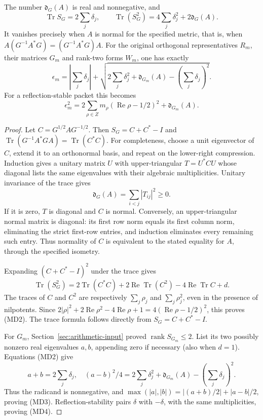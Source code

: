 \begin{theorem}
The number \(\mathfrak d_G(A)\) is real and nonnegative, and
\[
 \operatorname{Tr}S_G=2\sum_j\delta_j,\qquad
 \operatorname{Tr}(S_G^2)=4\sum_j\delta_j^2+2\mathfrak d_G(A).
 \tag{MD2}
\]
It vanishes precisely when \(A\) is normal for the specified
metric, that is, when
\(A(G^{-1}A^*G)=(G^{-1}A^*G)A\).
For the original orthogonal representatives \(R_m\), their
matrices \(G_m\) and rank-two forms \(W_m\), one has exactly
\[
 \epsilon_m=\left|\sum_j\delta_j\right|
 +\sqrt{2\sum_j\delta_j^2+\mathfrak d_{G_m}(A)
                     -\left(\sum_j\delta_j\right)^2}.
 \tag{MD3}
\]
For a reflection-stable packet this becomes
\[
 \boxed{\epsilon_m^2=2\sum_{\rho\in Z}m_\rho
               (\operatorname{Re}\rho-1/2)^2+\mathfrak d_{G_m}(A).}
 \tag{MD4}
\]
\end{theorem}
\begin{proof}
Let \(C=G^{1/2}AG^{-1/2}\). Then
\(S_G=C+C^*-I\) and
\(\operatorname{Tr}(G^{-1}A^*GA)=\operatorname{Tr}(C^*C)\).
For completeness, choose a unit eigenvector of \(C\), extend it
to an orthonormal basis, and repeat on the lower-right compression.
Induction gives a unitary matrix \(U\) with upper-triangular
\(T=U^*CU\) whose diagonal lists the same eigenvalues with their
algebraic multiplicities. Unitary invariance of the trace gives
\[
 \mathfrak d_G(A)=\sum_{i<j}|T_{ij}|^2\geq0 .
 \tag{MD5}
\]
If it is zero, \(T\) is diagonal and \(C\) is normal. Conversely,
an upper-triangular normal matrix is diagonal: its first row norm
equals its first column norm, eliminating the strict first-row
entries, and induction eliminates every remaining such entry.
Thus normality of \(C\) is equivalent to the stated equality for
\(A\), through the specified isometry.

Expanding \((C+C^*-I)^2\) under the trace gives
\[
 \operatorname{Tr}(S_G^2)=2\operatorname{Tr}(C^*C)
                 +2\operatorname{Re}\operatorname{Tr}(C^2)
                 -4\operatorname{Re}\operatorname{Tr}C+d .
\]
The traces of \(C\) and \(C^2\) are respectively
\(\sum_j\rho_j\) and \(\sum_j\rho_j^2\), even in the presence
of nilpotents. Since
\(2|\rho|^2+2\operatorname{Re}\rho^2
-4\operatorname{Re}\rho+1=4(\operatorname{Re}\rho-1/2)^2\),
this proves (MD2). The trace formula follows directly from
\(S_G=C+C^*-I\).

For \(G_m\), Section~\ref{sec:arithmetic-input} proved
\(\operatorname{rank}S_{G_m}\leq2\). List its two possibly
nonzero real eigenvalues \(a,b\), appending zero if necessary
(also when \(d=1\)). Equations (MD2) give
\[
 a+b=2\sum_j\delta_j,\quad
 (a-b)^2/4=2\sum_j\delta_j^2+\mathfrak d_{G_m}(A)
                          -(\sum_j\delta_j)^2 .
\]
Thus the radicand is nonnegative, and
\(\max(|a|,|b|)=|(a+b)/2|+|a-b|/2\), proving (MD3).
Reflection-stability pairs \(\delta\) with \(-\delta\), with
the same multiplicities, proving (MD4).
\end{proof}

